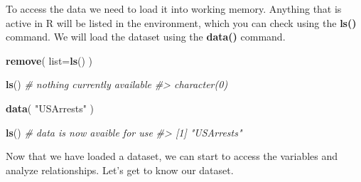 \documentclass[]{book}
\newenvironment{Shaded}{\begin{snugshade}}{\end{snugshade}}
\newcommand{\CommentTok}[1]{\textcolor[rgb]{0.56,0.35,0.01}{\textit{#1}}}
\newcommand{\DataTypeTok}[1]{\textcolor[rgb]{0.13,0.29,0.53}{#1}}
\newcommand{\KeywordTok}[1]{\textcolor[rgb]{0.13,0.29,0.53}{\textbf{#1}}}
\newcommand{\NormalTok}[1]{#1}
\newcommand{\StringTok}[1]{\textcolor[rgb]{0.31,0.60,0.02}{#1}}
\theoremstyle{definition}
\theoremstyle{definition}
\theoremstyle{definition}
\theoremstyle{remark}
\begin{document}
To access the data we need to load it into working memory. Anything that
is active in R will be listed in the environment, which you can check
using the \textbf{ls()} command. We will load the dataset using the
\textbf{data()} command.

\begin{Shaded}
\begin{Highlighting}[]
\KeywordTok{remove}\NormalTok{( }\DataTypeTok{list=}\KeywordTok{ls}\NormalTok{() )}
\end{Highlighting}
\end{Shaded}

\begin{Shaded}
\begin{Highlighting}[]

\KeywordTok{ls}\NormalTok{() }\CommentTok{# nothing currently available}
\CommentTok{#> character(0)}

\KeywordTok{data}\NormalTok{( }\StringTok{"USArrests"}\NormalTok{ )}

\KeywordTok{ls}\NormalTok{() }\CommentTok{# data is now avaible for use}
\CommentTok{#> [1] "USArrests"}
\end{Highlighting}
\end{Shaded}

Now that we have loaded a dataset, we can start to access the variables
and analyze relationships. Let's get to know our dataset.
\end{document}
